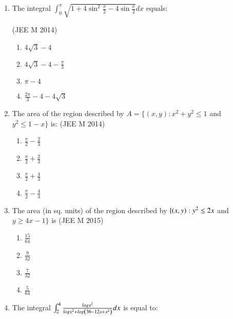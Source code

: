 \documentclass[journal,12pt,twocolumn]{IEEEtran}
\theoremstyle{remark}
\begin{document}
\begin{enumerate}[label=\textcolor{black}{\arabic*.}]

	\item The integral $\int_0^{\pi}\sqrt{1+4\sin ^2\frac{x}{2}-4\sin \frac{x}{2}}dx$ equals:

		\hfill{(JEE M 2014)}

		\begin{multicols}{2}
			\begin{enumerate}[label=(\alph*)]
				\item $4\sqrt{3}-4$
				\item $4\sqrt{3}-4-\frac{\pi}{3}$
				\item $\pi-4$
				\item $\frac{2\pi}{3}-4-4\sqrt{3}$
			\end{enumerate}
		\end{multicols}


	\item The area of the region described by $A=\{(x,y):x^2+y^2\leq1$ and $y^2\leq1-x\}$ is:
		\hfill{(JEE M 2014)}

		\begin{multicols}{4}
			\begin{enumerate}[label=(\alph*)]
				\item $\frac{\pi}{2}-\frac{2}{3}$
				\item $\frac{\pi}{2}+\frac{2}{3}$
				\item $\frac{\pi}{2}+\frac{4}{3}$
				\item $\frac{\pi}{2}-\frac{4}{3}$
			\end{enumerate}
		\end{multicols}


	\item The area (in sq. units) of the region described by $\{\left(x,y\right):y^2\leq2x$ and $y\geq4x-1\}$ is
		\hfill{(JEE M 2015)}

		\begin{multicols}{4}
			\begin{enumerate}[label=(\alph*)]
				\item $\frac{15}{64}$
				\item $\frac{9}{32}$
				\item $\frac{7}{32}$
				\item $\frac{5}{64}$
			\end{enumerate}
		\end{multicols}


	\item The integral $\int_2^4\frac{log x^2}{log x^2 + log\left(36-12x+x^2\right)}dx$ is equal to:


\end{enumerate}
\end{document}

